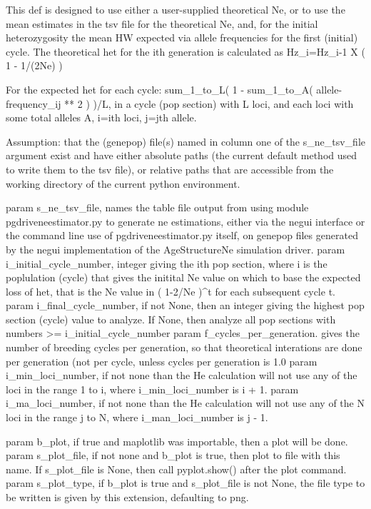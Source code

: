 \begin{DoxyVerb}This def is designed to use either a user-supplied theoretical Ne, or to
use the mean estimates in the tsv file for the theoretical Ne, and, for
the initial heterozygosity the mean HW expected via allele frequencies
for the first (initial) cycle.  The theoretical het for the ith generation
is calculated as
    Hz_i=Hz_{i-1} X ( 1 - 1/(2Ne) )

For the expected het for each cycle:
        sum_1_to_L(  1 - sum_1_to_A( allele-frequency_ij ** 2 ) )/L, in a cycle
        (pop section) with L loci, and each loci with some total alleles A, i=ith loci,
        j=jth allele.

Assumption:  that the (genepop) file(s) named in column one of the s_ne_tsv_file 
        argument exist and have either absolute paths (the current
        default method used to write them to the tsv file), or relative
        paths that are accessible from the working directory of the
        current python environment.

param s_ne_tsv_file, names the table file output from using module
    pgdriveneestimator.py to generate ne estimations, either
    via the negui interface or the command line use of pgdriveneestimator.py 
    itself, on genepop files generated by the negui implementation of
    the AgeStructureNe simulation driver.
param i_initial_cycle_number, integer giving the ith pop section,
    where i is the poplulation (cycle) that gives the initital Ne value on which
    to base the expected loss of het, that is the Ne value in ( 1-2/Ne )^t for
    each subsequent cycle t.
param i_final_cycle_number, if not None, then an integer giving the highest pop section
    (cycle) value to analyze.  If None, then analyze all pop sections with numbers 
    >= i_initial_cycle_number
param f_cycles_per_generation.  gives the number of breeding cycles per generation, so
    that theoretical interations are done per generation (not per cycle, unless 
    cycles per generation is 1.0
param i_min_loci_number, if not none than the He calculation will not use any of the loci
        in the range 1 to i, where i_min_loci_number is i + 1.
param i_ma_loci_number, if not none than the He calculation will not use any of the N loci
        in the range j to N, where i_man_loci_number is j - 1.

param b_plot, if true and maplotlib was importable, then a plot will be done.
param s_plot_file, if not none and b_plot is true, then plot to file with this name.
        If s_plot_file is None, then call pyplot.show() after the plot command.
param s_plot_type, if b_plot is true and s_plot_file is not None, the file type
        to be written is given by this extension, defaulting to png.\end{DoxyVerb}
 

